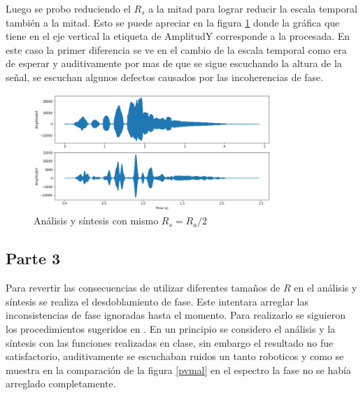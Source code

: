\documentclass[a4paper]{article}
\begin{document}
Luego se probo reduciendo el $R_s$ a la mitad para lograr reducir la escala temporal también a la mitad. Esto se puede apreciar en la figura \ref{mitad} donde la gráfica que tiene en el eje vertical la etiqueta de AmplitudY corresponde a la procesada. En este caso la primer diferencia se ve en el cambio de la escala temporal como era de esperar y auditivamente por mas de que se sigue escuchando la altura de la señal, se escuchan algunos defectos causados por las incoherencias de fase. 

\begin{figure}[h!]
\centering
\includegraphics[width=0.8\textwidth]{mitad.png}
\caption{Análisis y síntesis con mismo $R_s = R_a/2$}
\label{mitad}
\end{figure}

\subsection{Parte 3}
Para revertir las consecuencias de utilizar diferentes tamaños de $R$ en el análisis y síntesis se realiza el desdoblamiento de fase. Este intentara arreglar las inconsistencias de fase ignoradas hasta el momento. Para realizarlo se siguieron los procedimientos sugeridos en \cite{PV}. En un principio se considero el análisis y la síntesis con las funciones realizadas en clase, sin embargo el resultado no fue satisfactorio, auditivamente se escuchaban ruidos un tanto roboticos y como se muestra en la comparación de la figura \ref{pvmal} en el espectro la fase no se había arreglado completamente. 
\end{document}
